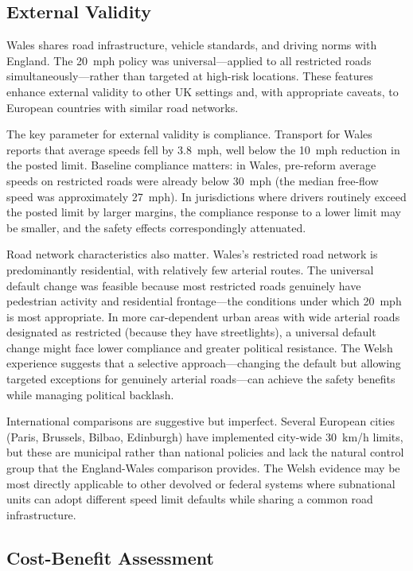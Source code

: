 \documentclass[12pt]{article}
\begin{document}
\subsection{External Validity}

Wales shares road infrastructure, vehicle standards, and driving norms with England. The 20~mph policy was universal---applied to all restricted roads simultaneously---rather than targeted at high-risk locations. These features enhance external validity to other UK settings and, with appropriate caveats, to European countries with similar road networks.

The key parameter for external validity is compliance. Transport for Wales reports that average speeds fell by 3.8~mph, well below the 10~mph reduction in the posted limit. Baseline compliance matters: in Wales, pre-reform average speeds on restricted roads were already below 30~mph (the median free-flow speed was approximately 27~mph). In jurisdictions where drivers routinely exceed the posted limit by larger margins, the compliance response to a lower limit may be smaller, and the safety effects correspondingly attenuated.

Road network characteristics also matter. Wales's restricted road network is predominantly residential, with relatively few arterial routes. The universal default change was feasible because most restricted roads genuinely have pedestrian activity and residential frontage---the conditions under which 20~mph is most appropriate. In more car-dependent urban areas with wide arterial roads designated as restricted (because they have streetlights), a universal default change might face lower compliance and greater political resistance. The Welsh experience suggests that a selective approach---changing the default but allowing targeted exceptions for genuinely arterial roads---can achieve the safety benefits while managing political backlash.

International comparisons are suggestive but imperfect. Several European cities (Paris, Brussels, Bilbao, Edinburgh) have implemented city-wide 30~km/h limits, but these are municipal rather than national policies and lack the natural control group that the England-Wales comparison provides. The Welsh evidence may be most directly applicable to other devolved or federal systems where subnational units can adopt different speed limit defaults while sharing a common road infrastructure.

\subsection{Cost-Benefit Assessment}
\end{document}
